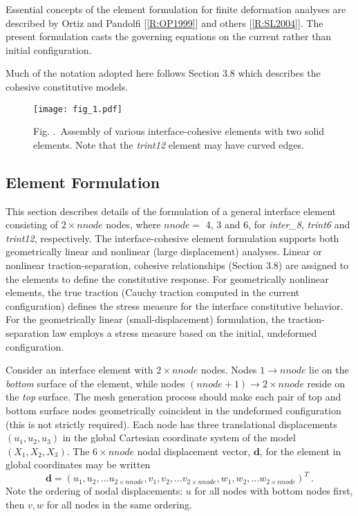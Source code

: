 \documentclass[11pt]{report}
\numberwithin{equation}{section}
\newcommand{\bmf } {\boldsymbol }  %
\newcommand{\ti}{\emph}
\renewcommand{\thefigure}{\thesection.\arabic{figure}}
\begin{document}
Essential concepts of the element formulation for finite deformation analyses are
described by Ortiz and Pandolfi [\ref{R:OP1999}] and others [\ref{R:SL2004}].
The present formulation casts 
the governing equations on the current rather than initial configuration.

Much of the notation adopted here follows Section 3.8 which describes the
cohesive constitutive models.
%
\begin{figure}[htb]
\begin{center}
\texttt{[image: fig\_1.pdf]} 
\caption{{\small Fig. \thefigure\ Assembly of various interface-cohesive elements
with two solid elements. Note that the \ti{trint12} element may have curved edges.}
\label{fig:inter_def}}
%
\end{center}
\end{figure}


\subsection{Element Formulation}

This section describes details of the formulation of a general interface element 
consisting of $2 \times nnode$ nodes, where 
$nnode=$ 4, 3 and 6, for \ti{inter\_8}, \ti{trint6} and \ti{trint12}, respectively. 
The interface-cohesive element formulation supports both geometrically 
linear and nonlinear (large displacement) analyses. Linear or nonlinear 
traction-separation, cohesive relationships (Section 3.8) are 
assigned to the elements to define the 
constitutive response. For geometrically nonlinear elements, the true 
traction (Cauchy traction computed in the current configuration) defines 
the stress measure for the interface constitutive behavior. For the 
geometrically linear (small-displacement) formulation, the traction-separation 
law employs a stress measure based on the initial, undeformed configuration. 

 Consider an interface element with $2 \times nnode$ nodes. 
 Nodes $1 \rightarrow nnode$ lie on the \ti{bottom} surface of the 
 element, while nodes $(nnode+1) \rightarrow 2 \times nnode$ reside 
 on the \ti{top} surface. The mesh generation process should make each 
 pair of top and bottom surface nodes geometrically coincident in the undeformed 
 configuration (this is not strictly required). Each node 
 has three translational displacements $(u_1, u_2, u_3)$ in the 
 global Cartesian coordinate system of the model $(X_1, X_2, X_3)$. 
 The $6 \times nnode $ 
 nodal displacement vector, $\bmf{d}$, for the element in global 
 coordinates  may be written 
%
\begin{equation}
\bmf{d} = \left ( u_1, u_2, ... u_{2 \times nnode}, 
v_1, v_2, ... v_{2 \times nnode}, w_1, w_2, ... w_{2 \times nnode}
\right )^T\ .
\end{equation}
%
Note the ordering of nodal displacements: $u$ for all nodes with bottom nodes first,
then $v, w$ for all nodes in the same ordering.
\end{document}
